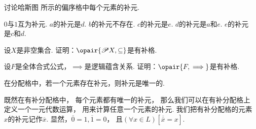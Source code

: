 \begin{example}
讨论哈斯图  所示的偏序格中每个元素的补元.
\begin{figure}[hbt]
	\centering
	\caption{}
	\label{figure:格论.偏序集4}
\end{figure}
\begin{solution}
\(0\)与\(1\)互为补元.
\(a\)的补元是\(d\).
\(b\)的补元不存在.
\(c\)的补元是\(e\).
\(d\)的补元是\(a\)和\(e\).
\(e\)的补元是\(c\)和\(d\).
\end{solution}
\end{example}

\begin{example}
设\(X\)是非空集合.
证明：\(\opair{\Powerset X,\subseteq}\)是有补格.
\end{example}

\begin{example}
设\(F\)是全体合式公式，\(\implies\)是逻辑蕴含关系.
证明：\(\opair{F,\implies}\)是有补格.
\end{example}

\begin{theorem}
在分配格中，若一个元素存在补元，则补元是唯一的.
\end{theorem}

既然在有补分配格中，
每个元素都有唯一的补元，
那么我们可以在有补分配格上定义一个一元代数运算，
用来计算任意一个元素的补元.
我们把有补分配格的元素\(x\)的补元记作\(\overline{x}\).
显然，\(\overline{0} = 1,
\overline{1} = 0\)，
且\((\forall x \in L)
\left[\overline{\overline{x}} = x\right]\).
